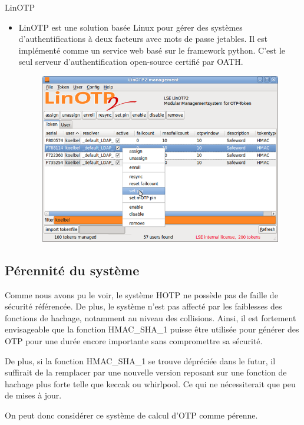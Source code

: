 \documentclass{../res/univ-projet}
\begin{document}
  LinOTP
  \begin{itemize}
    \item LinOTP est une solution basée Linux pour gérer des systèmes d'authentifications à deux facteurs avec mots de passe jetables.
	  Il est implémenté comme un service web basé sur le framework python. C'est le seul serveur d'authentification open-source certifié par OATH.
	  \begin{figure}[h!]
	    \centerline{\includegraphics[scale=0.4]{linOTP.png}}
	  \end{figure}
  \end{itemize}  
  
  \subsection{Pérennité du système}
    Comme nous avons pu le voir, le système HOTP ne possède pas de faille de sécurité référencée. De plus, le système n'est pas affecté par les faiblesses des fonctions de 
    hachage, notamment au niveau des collisions. Ainsi, il est fortement envisageable que la fonction HMAC\_SHA\_1 puisse être utilisée pour générer des OTP pour une durée
    encore importante sans compromettre sa sécurité.
    
    De plus, si la fonction HMAC\_SHA\_1 se trouve dépréciée dans le futur, il suffirait de la remplacer par une nouvelle version reposant sur une fonction de hachage plus 
    forte telle que keccak ou whirlpool. Ce qui ne nécessiterait que peu de mises à jour.
    
    On peut donc considérer ce système de calcul d'OTP comme pérenne.
    
\end{document}
